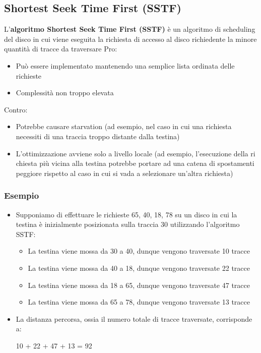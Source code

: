 \documentclass{article}
\begin{document}
\subsection{Shortest Seek Time First (SSTF)}
L'\textbf{algoritmo Shortest Seek Time First (SSTF)} è un algoritmo di scheduling del disco in cui viene eseguita la richiesta di accesso al disco richiedente la minore quantità di tracce da traversare
Pro:
\begin{itemize}
    \item Può essere implementato mantenendo una semplice lista ordinata delle richieste
    \item Complessità non troppo elevata
\end{itemize}
Contro:
\begin{itemize}
    \item Potrebbe causare starvation (ad esempio, nel caso in cui una richiesta necessiti di una traccia troppo distante dalla testina)
    \item L'ottimizzazione avviene solo a livello locale (ad esempio, l'esecuzione della ri chiesta più vicina alla testina potrebbe portare ad una catena di spostamenti peggiore rispetto al caso in cui si vada a selezionare un'altra richiesta)
\end{itemize}


\subsubsection{Esempio}
\begin{itemize}
    \item Supponiamo di effettuare le richieste 65, 40, 18, 78 su un disco in cui la testina è inizialmente posizionata sulla traccia 30 utilizzando l'algoritmo SSTF:
    \begin{itemize}
        \item La testina viene mossa da 30 a 40, dunque vengono traversate 10 tracce 
        \item La testina viene mossa da 40 a 18, dunque vengono traversate 22 tracce 
        \item La testina viene mossa da 18 a 65, dunque vengono traversate 47 tracce 
        \item La testina viene mossa da 65 a 78, dunque vengono traversate 13 tracce
    \end{itemize}
    \item La distanza percorsa, ossia il numero totale di tracce traversate, corrisponde a:
    \begin{center}
        10 + 22 + 47 + 13 = 92
    \end{center}
\end{itemize}
\pagebreak
\end{document}
